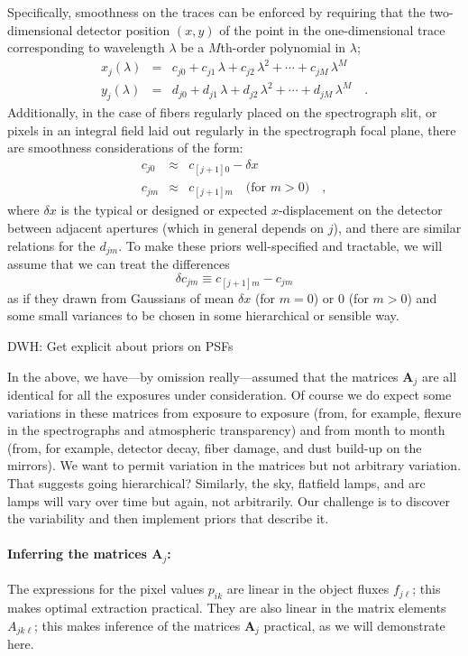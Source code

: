 \documentclass[12pt]{article}
\newcommand{\hmatrix}[1]{\boldsymbol{#1}}
\newcommand{\Amatrix}{\hmatrix{A}}
\begin{document}
Specifically, smoothness on the traces can be enforced by requiring
that the two-dimensional detector position $(x,y)$ of the point in the
one-dimensional trace corresponding to wavelength $\lambda$ be a
$M$th-order polynomial in $\lambda$;
\begin{eqnarray}\displaystyle
x_j(\lambda) & = & c_{j0} + c_{j1}\,\lambda + c_{j2}\,\lambda^2 + \cdots + c_{jM}\,\lambda^M \\
y_j(\lambda) & = & d_{j0} + d_{j1}\,\lambda + d_{j2}\,\lambda^2 + \cdots + d_{j
M}\,\lambda^M \quad .
\end{eqnarray}
Additionally, in the case of fibers regularly placed on the
spectrograph slit, or pixels in an integral field laid out regularly
in the spectrograph focal plane, there are smoothness considerations
of the form:
\begin{eqnarray}\displaystyle
c_{j0} & \approx & c_{[j+1]0} - \delta x \\
c_{jm} & \approx & c_{[j+1]m} \quad \mbox{(for $m > 0$)} \quad ,
\end{eqnarray}
where $\delta x$ is the typical or designed or expected
$x$-displacement on the detector between adjacent apertures (which in
general depends on $j$), and there are similar relations for the
$d_{jm}$.  To make these priors well-specified and tractable, we will
assume that we can treat the differences
\begin{equation}
\delta c_{jm} \equiv c_{[j+1]m} - c_{jm}
\end{equation}
as if they drawn from Gaussians of mean $\delta x$ (for $m=0$) or $0$
(for $m>0$) and some small variances to be chosen in some hierarchical
or sensible way.

DWH: Get explicit about priors on PSFs

In the above, we have---by omission really---assumed that the matrices
$\Amatrix_j$ are all identical for all the exposures under
consideration.  Of course we do expect some variations in these
matrices from exposure to exposure (from, for example, flexure in the
spectrographs and atmospheric transparency) and from month to month
(from, for example, detector decay, fiber damage, and dust build-up on
the mirrors).  We want to permit variation in the matrices but not
arbitrary variation.  That suggests going hierarchical?  Similarly,
the sky, flatfield lamps, and arc lamps will vary over time but again,
not arbitrarily.  Our challenge is to discover the variability and
then implement priors that describe it.

\paragraph{Inferring the matrices $\Amatrix_j$:}
The expressions for the pixel values $p_{ik}$ are linear in the object
fluxes $f_{j\ell}$; this makes optimal extraction practical.  They are
also linear in the matrix elements $A_{jk\ell}$; this makes inference
of the matrices $\Amatrix_j$ practical, as we will demonstrate here.
\end{document}
